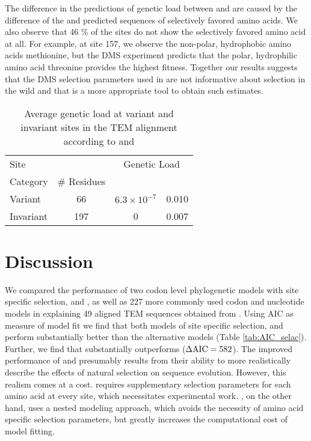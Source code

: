 The difference in the predictions of genetic load between \selac and \phydms are caused by the difference of the \selac and \phydms predicted sequences of selectively favored amino acids.
We also observe that 46 \% of the sites do not show the selectively favored amino acid at all.
For example, at site 157, we observe the non-polar, hydrophobic amino acids methionine, but the DMS experiment predicts that the polar, hydrophilic amino acid threonine provides the highest fitness.
Together our results suggests that the DMS selection parameters used in \phydms are not informative about selection in the wild and that \selac is a more appropriate tool to obtain such estimates.

\begin{table}
  \centering
  \caption{Average genetic load at variant and invariant sites in the TEM alignment according to \selac and \phydms}
  \begin{tabular}{lccc}
    \hline
	Site		& 		& \multicolumn{2}{c}{Genetic Load}  \\ 
    Category 		& \# Residues	& \multicolumn{1}{c}{\selac} & \multicolumn{1}{c}{\phydms} \\ \hline 
    Variant	&	66	& $6.3\times10^{-7}$ & 0.010  \\
    Invariant		& 	197	& 0 & 0.007 \\ \hline
  \end{tabular}
  \label{tab:selection}
\end{table}


\section{Discussion}
We compared the performance of two codon level phylogenetic models with site specific selection, \phydms and \selac, as well as 227 more commonly used codon and nucleotide models in explaining 49 aligned TEM sequences obtained from \citet{bloom2017}.
Using AIC as measure of model fit we find that both models of site specific selection, \phydms and \selac perform substantially better than the alternative models (Table \ref{tab:AIC_selac}).
Further, we find that \selac substantially outperforms \phydms ($\Delta\text{AIC} = 582$).
The improved performance of \phydms and \selac presumably results from their ability to more realistically describe the effects of natural selection on sequence evolution.
However, this realism comes at a cost. 
\phydms requires supplementary selection parameters for each amino acid at every site, which necessitates experimental work.
\selac, on the other hand, uses a nested modeling approach, which avoids the necessity of amino acid specific selection parameters, but greatly increases the computational cost of model fitting.


